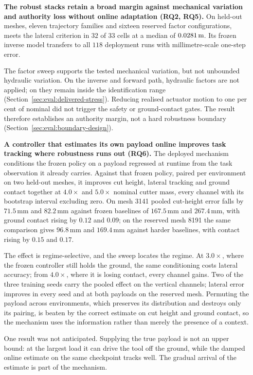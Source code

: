 \textbf{The robust stacks retain a broad margin against mechanical variation
and authority loss without online adaptation (RQ2, RQ5).} On held-out meshes,
eleven trajectory families and sixteen reserved factor configurations,
\ppoIDFD{} meets the lateral criterion in $32$ of $33$ cells at a median of
$\unit[0.0281]{m}$. Its frozen inverse model transfers to all $118$ deployment
runs with millimetre-scale one-step error.

The factor sweep supports the tested mechanical variation, but not unbounded
hydraulic variation. On the inverse and forward path, hydraulic factors are not
applied; on \ppoROM{} they remain inside the identification range
(Section~\ref{sec:eval:delivered-stress}). Reducing realised actuator motion to
one per cent of nominal did not trigger the safety or ground-contact gates.
The result therefore establishes an authority margin, not a hard robustness
boundary (Section~\ref{sec:eval:boundary-design}).

\textbf{A controller that estimates its own payload online improves task
tracking where robustness runs out (RQ6).} The deployed mechanism conditions the
frozen policy on a payload regressed at runtime from the task observation it
already carries. Against that frozen policy, paired per environment on two
held-out meshes, it improves cut height, lateral tracking and ground contact
together at $4.0\times$ and $5.0\times$ nominal cutter mass, every channel with
its bootstrap interval excluding zero. On mesh 3141 pooled cut-height error
falls by $71.5\,$mm and $82.2\,$mm against frozen baselines of $167.5\,$mm and
$267.4\,$mm, with ground contact rising by $0.12$ and $0.09$; on the reserved
mesh 8191 the same comparison gives $96.8\,$mm and $169.4\,$mm against harder
baselines, with contact rising by $0.15$ and $0.17$.

The effect is regime-selective, and the sweep locates the regime. At
$3.0\times$, where the frozen controller still holds the ground, the same
conditioning costs lateral accuracy; from $4.0\times$, where it is losing
contact, every channel gains. Two of the three training seeds carry the pooled
effect on the vertical channels; lateral error improves in every seed and at
both payloads on the reserved mesh. Permuting the payload across environments, which preserves its
distribution and destroys only its pairing, is beaten by the correct estimate on
cut height and ground contact, so the mechanism uses the information rather than
merely the presence of a context.

One result was not anticipated. Supplying the true payload is not an upper
bound: at the largest load it can drive the tool off the ground, while the
damped online estimate on the same checkpoint tracks well. The gradual arrival
of the estimate is part of the mechanism.

